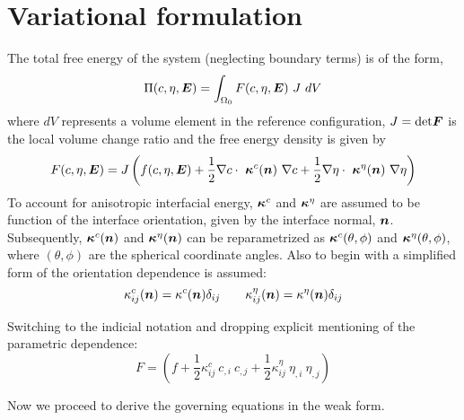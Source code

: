 \section{Variational formulation}
The total free energy of the system (neglecting boundary terms) is of the form,
\begin{equation}
\Pi(c, \eta, \mbox{\boldmath$ E$}) = \int_{\Omega_0} F(c, \eta, \mbox{\boldmath$ E$}) ~J~dV 
\end{equation}
where $dV$ represents a volume element in the reference configuration, $J= \text{det} \mbox{\boldmath$ F$}$ is the local volume change ratio and the free energy density is given by
\begin{equation}
 F(c, \eta, \mbox{\boldmath$ E$}) = J \left(  f(c, \eta, \mbox{\boldmath$ E$}) + \frac{1}{2} \nabla  c  \cdot ~\mbox{\boldmath$\kappa$}^c(\mbox{\boldmath$ n$}) ~\nabla  c + \frac{1}{2} \nabla  \eta  \cdot ~\mbox{\boldmath$\kappa$}^{\eta}(\mbox{\boldmath$ n$}) ~\nabla  \eta \right)
\end{equation}
To account for anisotropic interfacial energy, $\mbox{\boldmath$\kappa$}^c$ and $\mbox{\boldmath$\kappa$}^{\eta}$ are assumed to be function of the interface orientation, given by the interface normal, $\mbox{\boldmath$ n$}$. Subsequently, $\mbox{\boldmath$\kappa$}^c(\mbox{\boldmath$ n$})$ and $\mbox{\boldmath$\kappa$}^{\eta}(\mbox{\boldmath$ n$})$ can be reparametrized as $\mbox{\boldmath$\kappa$}^c(\theta, \phi)$ and $\mbox{\boldmath$\kappa$}^{\eta}(\theta, \phi)$, where $(\theta, \phi)$ are the spherical coordinate angles. Also to begin with a simplified form of the orientation dependence is assumed:
\begin{equation}
 \kappa^c_{ij} (\mbox{\boldmath$ n$}) = \kappa^c(\mbox{\boldmath$ n$}) \delta_{ij} \qquad  \kappa^{\eta}_{ij} (\mbox{\boldmath$ n$}) = \kappa^{\eta}(\mbox{\boldmath$ n$}) \delta_{ij}
\end{equation}

\noindent Switching to the indicial notation and dropping explicit mentioning of the parametric dependence:
\begin{equation}
 F =  \left( f + \frac{1}{2} \kappa^c_{ij}~c_{,i}~c_{,j} + \frac{1}{2} \kappa^{\eta}_{ij} ~\eta_{,i} ~\eta_{,j} \right) 
\end{equation}

\noindent Now we proceed to derive the governing equations in the weak form.

